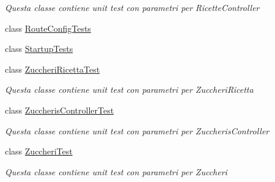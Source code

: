 \begin{DoxyCompactItemize}
\begin{DoxyCompactList}\small\item\em Questa classe contiene unit test con parametri per Ricette\+Controller\end{DoxyCompactList}\item 
class \mbox{\hyperlink{class_brew_day2_1_1_tests_1_1_route_config_tests}{Route\+Config\+Tests}}
\item 
class \mbox{\hyperlink{class_brew_day2_1_1_tests_1_1_startup_tests}{Startup\+Tests}}
\item 
class \mbox{\hyperlink{class_brew_day2_1_1_tests_1_1_zuccheri_ricetta_test}{Zuccheri\+Ricetta\+Test}}
\begin{DoxyCompactList}\small\item\em Questa classe contiene unit test con parametri per Zuccheri\+Ricetta\end{DoxyCompactList}\item 
class \mbox{\hyperlink{class_brew_day2_1_1_tests_1_1_zuccheris_controller_test}{Zuccheris\+Controller\+Test}}
\begin{DoxyCompactList}\small\item\em Questa classe contiene unit test con parametri per Zuccheris\+Controller\end{DoxyCompactList}\item 
class \mbox{\hyperlink{class_brew_day2_1_1_tests_1_1_zuccheri_test}{Zuccheri\+Test}}
\begin{DoxyCompactList}\small\item\em Questa classe contiene unit test con parametri per Zuccheri\end{DoxyCompactList}\end{DoxyCompactItemize}
